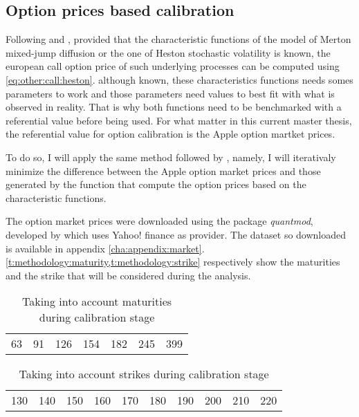 \documentclass[12pt]{report}
\begin{document}
\subsection{Option prices based calibration}
\label{sub:methodology:calibration:option}

Following \citet{heston1993} and \citet{criso2015}, provided that the characteristic functions of the model of Merton mixed-jump diffusion or the one of Heston stochastic volatility is known, the european call option price of such underlying processes can be computed using \cref{eq:other:call:heston}.
although known, these characteristics functions needs somes parameters to work and those parameters need values to best fit with what is observed in reality.
That is why both functions need to be benchmarked with a referential value  before being used.
For what matter in this current master thesis, the referential value for option calibration is the Apple option martket prices.

To do so, I will apply the same method followed by \citet{criso2015}, namely, I will iterativaly minimize the difference between the Apple option market prices and those generated by the function that compute the option prices based on the characteristic functions.

The option market prices were downloaded using the package \textit{quantmod}, developed by \citet{quantmod} which uses Yahoo! finance as provider. The dataset so downloaded is available in appendix \ref{cha:appendix:market}.
\cref{t:methodology:maturity,t:methodology:strike} respectively show the maturities and the strike that will be considered during the analysis.

\begin{table}[ht]
\centering
\begin{tabular}{lllllll}
  63 & 91 & 126 & 154 & 182 & 245 & 399 \\
\end{tabular}
\caption{Taking into account maturities during calibration stage} 
\label{t:methodology:maturity}
\end{table}

\begin{table}[ht]
\centering
\begin{tabular}{llllllllll}
  130 & 140 & 150 & 160 & 170 & 180 & 190 & 200 & 210 & 220 \\  
\end{tabular}
\caption{Taking into account strikes during calibration stage} 
\label{t:methodology:strike}
\end{table}
\end{document}
